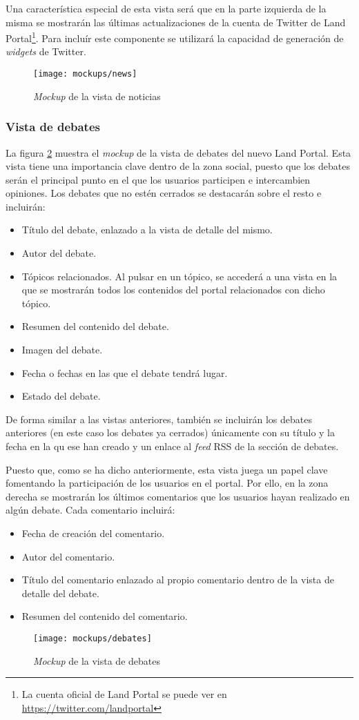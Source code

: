 Una característica especial de esta vista será que en la parte izquierda de la misma se mostrarán las últimas actualizaciones de la cuenta de Twitter de Land Portal\footnote{La cuenta oficial de Land Portal se puede ver en \url{https://twitter.com/landportal}}.  Para incluír este componente se utilizará la capacidad de generación de \textit{widgets} de Twitter.
\begin{figure}[h]
	\centering
	\texttt{[image: mockups/news]}
	\caption{\textit{Mockup} de la vista de noticias}
	\label{fig:mockup_noticias}
\end{figure}


\subsubsection{Vista de debates}
La figura \ref{fig:mockup_debates} muestra el \textit{mockup} de la vista de debates del nuevo Land Portal.  Esta vista tiene una importancia clave dentro de la zona social, puesto que los debates serán el principal punto en el que los usuarios participen e intercambien opiniones.  Los debates que no estén cerrados se destacarán sobre el resto e incluirán:
\begin{itemize}
	\item Título del debate, enlazado a la vista de detalle del mismo.
	\item Autor del debate.
	\item Tópicos relacionados.  Al pulsar en un tópico, se accederá a una vista en la que se mostrarán todos los contenidos del portal relacionados con dicho tópico.
	\item Resumen del contenido del debate.
	\item Imagen del debate.
	\item Fecha o fechas en las que el debate tendrá lugar.
	\item Estado del debate.
\end{itemize}

De forma similar a las vistas anteriores, también se incluirán los debates anteriores (en este caso los debates ya cerrados) únicamente con su título y la fecha en la qu ese han creado y un enlace al \textit{feed} RSS de la sección de debates.

Puesto que, como se ha dicho anteriormente, esta vista juega un papel clave fomentando la participación de los usuarios en el portal.  Por ello, en la zona derecha se mostrarán los últimos comentarios que los usuarios hayan realizado en algún debate.  Cada comentario incluirá:
\begin{itemize}
	\item Fecha de creación del comentario.
	\item Autor del comentario.
	\item Título del comentario enlazado al propio comentario dentro de la vista de detalle del debate.
	\item Resumen del contenido del comentario.
\end{itemize}
\begin{figure}[h]
	\centering
	\texttt{[image: mockups/debates]}
	\caption{\textit{Mockup} de la vista de debates}
	\label{fig:mockup_debates}
\end{figure}


